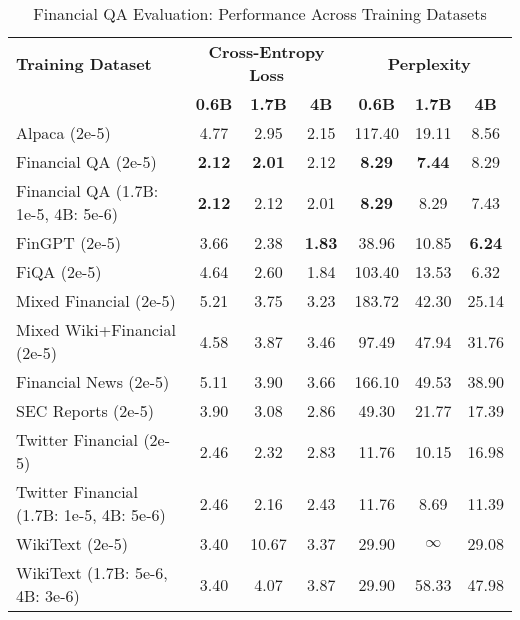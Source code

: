 
\begin{table}[h]
\centering
\caption[Financial QA Evaluation: Cross-Dataset Performance]{Financial QA Evaluation: Performance Across Training Datasets}
\label{tab:cross_financial_qa}
\begin{tabular}{l|ccc|ccc}
\hline
\textbf{Training Dataset} & \multicolumn{3}{c|}{\textbf{Cross-Entropy Loss}} & \multicolumn{3}{c}{\textbf{Perplexity}} \\
\cline{2-4} \cline{5-7}
  & \textbf{0.6B} & \textbf{1.7B} & \textbf{4B} & \textbf{0.6B} & \textbf{1.7B} & \textbf{4B} \\
Alpaca (2e-5) & 4.77 & 2.95 & 2.15 & 117.40 & 19.11 & 8.56  \\
Financial QA (2e-5) & \textbf{2.12} & \textbf{2.01} & 2.12 & \textbf{8.29} & \textbf{7.44} & 8.29  \\
Financial QA (1.7B: 1e-5, 4B: 5e-6) & \textbf{2.12} & 2.12 & 2.01 & \textbf{8.29} & 8.29 & 7.43  \\
FinGPT (2e-5) & 3.66 & 2.38 & \textbf{1.83} & 38.96 & 10.85 & \textbf{6.24}  \\
FiQA (2e-5) & 4.64 & 2.60 & 1.84 & 103.40 & 13.53 & 6.32  \\
Mixed Financial (2e-5) & 5.21 & 3.75 & 3.23 & 183.72 & 42.30 & 25.14  \\
Mixed Wiki+Financial (2e-5) & 4.58 & 3.87 & 3.46 & 97.49 & 47.94 & 31.76  \\
Financial News (2e-5) & 5.11 & 3.90 & 3.66 & 166.10 & 49.53 & 38.90  \\
SEC Reports (2e-5) & 3.90 & 3.08 & 2.86 & 49.30 & 21.77 & 17.39  \\
Twitter Financial (2e-5) & 2.46 & 2.32 & 2.83 & 11.76 & 10.15 & 16.98  \\
Twitter Financial (1.7B: 1e-5, 4B: 5e-6) & 2.46 & 2.16 & 2.43 & 11.76 & 8.69 & 11.39  \\
WikiText (2e-5) & 3.40 & 10.67 & 3.37 & 29.90 & $\infty$ & 29.08  \\
WikiText (1.7B: 5e-6, 4B: 3e-6) & 3.40 & 4.07 & 3.87 & 29.90 & 58.33 & 47.98  \\
\hline
\end{tabular}
\end{table}

